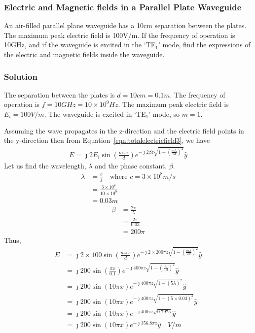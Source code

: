 \begin{exmp}
\subsubsection*{Electric and Magnetic fields in a Parallel Plate Waveguide}
An air-filled parallel plane waveguide has a 10cm separation between the plates. The maximum peak electric field is 100V/m. If the frequency of operation is 10GHz, and if the waveguide is excited in the `TE$_1$' mode, find the expressions of the electric and magnetic fields inside the waveguide.

\subsubsection*{Solution}
The separation between the plates is $d = 10cm = 0.1m$. The frequency of operation is $f = 10GHz = 10\times 10^9Hz$. The maximum peak electric field is $E_i = 100V/m$. The waveguide is excited in `TE$_1$' mode, so $m=1$.

Assuming the wave propagates in the z-direction and the electric field points in the y-direction then from Equation~\eqref{eqn:totalelectricfield3}, we have
\begin{align*}
\bar{E} = \jmath 2E_i\sin(\frac{m\pi x}{d})e^{-\jmath 2\beta z\sqrt{1 - \left(\frac{m\lambda}{2d}\right)^2}}\hat{y}
\end{align*}
Let us find the wavelength, $\lambda$ and the phase constant, $\beta$.
\begin{align*}
\lambda &= \frac{c}{f}\quad\text{where } c = 3\times 10^8m/s\\
&= \frac{3\times 10^8}{10\times 10^9}\\
&= 0.03m
\end{align*}
\begin{align*}
\beta &= \frac{2\pi}{\lambda}\\
&= \frac{2\pi}{0.03}\\
&= 200\pi
\end{align*}
Thus,
\begin{align*}
\bar{E} &= \jmath 2\times100\sin(\frac{m\pi x}{d})e^{-\jmath 2\times200\pi z\sqrt{1 - \left(\frac{m\lambda}{2d}\right)^2}}\hat{y}\\
&= \jmath 200\sin(\frac{\pi x}{0.1})e^{-\jmath 400\pi z\sqrt{1 - \left(\frac{\lambda}{0.2}\right)^2}}\hat{y}\\
&= \jmath 200\sin(10\pi x)e^{-\jmath 400\pi z\sqrt{1 - {(5\lambda)}^2}}\hat{y}\\
&= \jmath 200\sin(10\pi x)e^{-\jmath 400\pi z\sqrt{1 - {(5\times0.03)}^2}}\hat{y}\\
&= \jmath 200\sin(10\pi x)e^{-\jmath 400\pi z\sqrt{0.7975}}\hat{y}\\
&= \jmath 200\sin(10\pi x)e^{-\jmath 356.8\pi z}\hat{y}\quad V/m
\end{align*}


\end{exmp}
